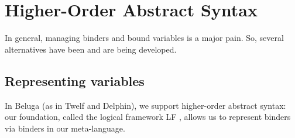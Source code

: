 






\section{Higher-Order Abstract Syntax}\label{sec:HOAS}
In general, managing binders and bound variables is a major pain. So,
several alternatives have been and are being developed.

\subsection{Representing variables}\label{sec:HOAS-var}
In Beluga (as in Twelf and Delphin), we support higher-order abstract
syntax: our foundation, called the logical framework LF
\citep{Harper93jacm}, allows us to represent binders via binders in our
meta-language.

